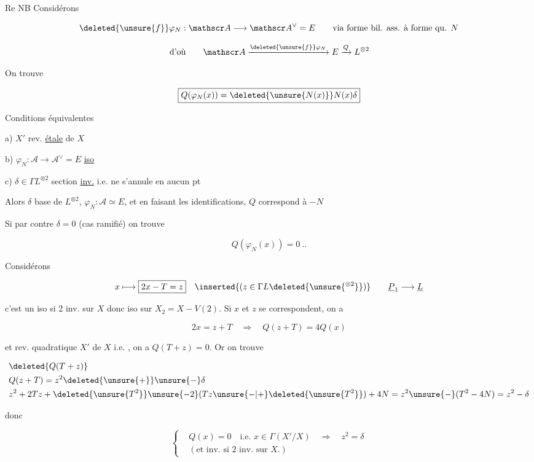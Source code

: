 
Re NB \qquad Considérons

\[
\deleted{\unsure{f}}\varphi_N:\mathscr A\longrightarrow\mathscr A^\vee=E\qquad\text{via forme bil. ass. à forme qu. }N
\]

\[
\text{d'où}\qquad \mathscr A\xrightarrow{\deleted{\unsure{f}}\varphi_N}E\xrightarrow{Q}L^{\otimes 2}
\]

On trouve

\[
\boxed{Q(\varphi_N(x))=\deleted{\unsure{N(x)}}N(x)\delta}
\]



Conditions équivalentes

a) $X'$ rev. \uline{étale} de $X$

b) $\varphi_N:\mathscr A\longrightarrow\mathscr A^\vee=E$ \uline{iso}

c) $\delta\in\Gamma L^{\otimes 2}$ section \uline{inv.} i.e. ne s'annule en aucun pt

Alors $\delta$ base de $L^{\otimes 2}$, $\varphi_N:\mathscr A\simeq E$, et en faisant les identifications, $Q$ correspond à $-N$

Si par contre $\delta=0$ (cas  ramifié) on trouve

\[
Q(\varphi_N(x))=0\ ..
\]

Considérons

\[
x\longmapsto\boxed{2x-T=z}\quad\inserted{(z\in\Gamma L\deleted{\unsure{^{\otimes 2}}})}\qquad \underline P_1\longrightarrow\underline L
\]

c'est un iso si 2 inv. sur $X$ donc iso sur $X_2=X-V(2)$. Si $x$ et $z$ se correspondent, on a

\[
2x=z+T\quad\Longrightarrow\quad Q(z+T)=4Q(x)
\]

et   rev. quadratique $X'$ de $X$ i.e. , on a $Q(T+z)=0$. Or on trouve  

\[
\begin{aligned}
&\deleted{Q(T+z)}\\
&Q(z+T)=z^2\deleted{\unsure{+}} \unsure{-}\delta\\
&z^2+2Tz+\deleted{\unsure{T^2}}\unsure{-2}(Tz\unsure{-|+}\deleted{\unsure{T^2}})+4N=z^2\unsure{-}(T^2-4N)=z^2-\delta
\end{aligned}
\]

donc

\[
\left\{\begin{aligned}
&Q(x)=0\quad\text{i.e. }x\in\Gamma(X'/X)\quad\Longrightarrow\quad\boxed{z^2=\delta}\\
&(\text{et inv. si }2\text{ inv. sur }X.)
\end{aligned}\right.
\]

